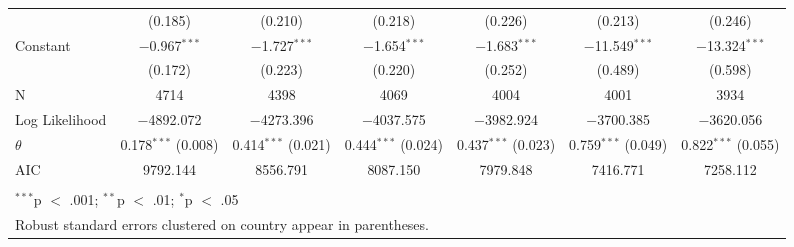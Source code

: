\begin{table}[!htbp]
\begin{tabular}{@{\extracolsep{5pt}}lcccccc}
  & (0.185) & (0.210) & (0.218) & (0.226) & (0.213) & (0.246) \\ 
  Constant & $-$0.967$^{***}$ & $-$1.727$^{***}$ & $-$1.654$^{***}$ & $-$1.683$^{***}$ & $-$11.549$^{***}$ & $-$13.324$^{***}$ \\ 
  & (0.172) & (0.223) & (0.220) & (0.252) & (0.489) & (0.598) \\ 
 N & 4714 & 4398 & 4069 & 4004 & 4001 & 3934 \\ 
Log Likelihood & $-$4892.072 & $-$4273.396 & $-$4037.575 & $-$3982.924 & $-$3700.385 & $-$3620.056 \\ 
$\theta$ & 0.178$^{***}$  (0.008) & 0.414$^{***}$  (0.021) & 0.444$^{***}$  (0.024) & 0.437$^{***}$  (0.023) & 0.759$^{***}$  (0.049) & 0.822$^{***}$  (0.055) \\ 
AIC & 9792.144 & 8556.791 & 8087.150 & 7979.848 & 7416.771 & 7258.112 \\ 
\hline \\[-1.8ex] 
\multicolumn{7}{l}{$^{***}$p $<$ .001; $^{**}$p $<$ .01; $^{*}$p $<$ .05} \\ 
\multicolumn{7}{l}{Robust standard errors clustered on country appear in parentheses.} \\ 
\end{tabular} 
\end{table} 
